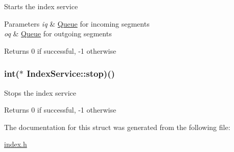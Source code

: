 \-Starts the index service 
\begin{DoxyParams}{\-Parameters}
{\em iq} & \hyperlink{structQueue}{\-Queue} for incoming segments \\
\hline
{\em oq} & \hyperlink{structQueue}{\-Queue} for outgoing segments \\
\hline
\end{DoxyParams}
\begin{DoxyReturn}{\-Returns}
0 if successful, -\/1 otherwise 
\end{DoxyReturn}
\hypertarget{structIndexService_a7225479bd31c555bd4a4c9d2698dff52}{
\subsubsection[{stop}]{\setlength{\rightskip}{0pt plus 5cm}int($\ast$ {\bf \-Index\-Service\-::stop})()}}\label{structIndexService_a7225479bd31c555bd4a4c9d2698dff52}
\-Stops the index service \begin{DoxyReturn}{\-Returns}
0 if successful, -\/1 otherwise 
\end{DoxyReturn}


\-The documentation for this struct was generated from the following file\-:\begin{DoxyCompactItemize}
\item 
\hyperlink{index_8h}{index.\-h}\end{DoxyCompactItemize}
